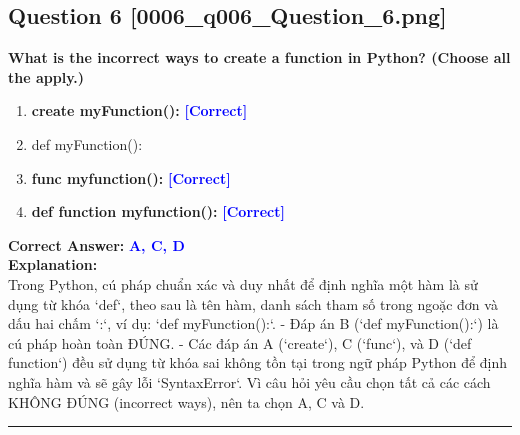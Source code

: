 \documentclass[11pt,a4paper]{article}
\begin{document}
\begin{minipage}{\textwidth}
\subsection*{Question 6 \quad \footnotesize{[0006_q006_Question_6.png]}}
\noindent \textbf{What is the incorrect ways to create a function in Python? (Choose all the apply.)}

\begin{enumerate}[label=\Alph*.]
    \item \textbf{create myFunction():} \hfill \textcolor{blue}{\textbf{[Correct]}}
    \item def myFunction():
    \item \textbf{func myfunction():} \hfill \textcolor{blue}{\textbf{[Correct]}}
    \item \textbf{def function myfunction():} \hfill \textcolor{blue}{\textbf{[Correct]}}
\end{enumerate}

\noindent \textbf{Correct Answer:} \textcolor{blue}{\textbf{A, C, D}} \\[4pt]
\noindent \textbf{Explanation:}\\
Trong Python, cú pháp chuẩn xác và duy nhất để định nghĩa một hàm là sử dụng từ khóa `def`, theo sau là tên hàm, danh sách tham số trong ngoặc đơn và dấu hai chấm `:`, ví dụ: `def myFunction():`.\newline
- Đáp án B (`def myFunction():`) là cú pháp hoàn toàn ĐÚNG.\newline
- Các đáp án A (`create`), C (`func`), và D (`def function`) đều sử dụng từ khóa sai không tồn tại trong ngữ pháp Python để định nghĩa hàm và sẽ gây lỗi `SyntaxError`.\newline
Vì câu hỏi yêu cầu chọn tất cả các cách KHÔNG ĐÚNG (incorrect ways), nên ta chọn A, C và D.
\end{minipage}
\vspace{0.8cm}
\hrule
\vspace{0.5cm}
\end{document}
